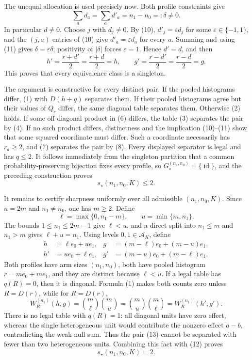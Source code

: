 The unequal allocation is used precisely now. Both profile constraints give
\[
 \sum_a d_a=\sum_a d'_a=n_1-n_0=:\delta\neq0.
 \tag{11}
\]
In particular \(d\neq0\). Choose \(j\) with \(d_j\neq0\). By (10), \(d'_j=\varepsilon d_j\) for some \(\varepsilon\in\{-1,1\}\), and the \((j,a)\) entries of (10) give \(d'_a=\varepsilon d_a\) for every \(a\). Summing and using (11) gives \(\delta=\varepsilon\delta\); positivity of \(|\delta|\) forces \(\varepsilon=1\). Hence \(d'=d\), and then
\[
 h'=\frac{r+d'}2=\frac{r+d}2=h,
 \qquad
 g'=\frac{r-d'}2=\frac{r-d}2=g.
\]
This proves that every equivalence class is a singleton.

The argument is constructive for every distinct pair. If the pooled histograms differ, (1) with \(D(h+g)\) separates them. If their pooled histograms agree but their values of \(Q_r\) differ, the same diagonal table separates them. Otherwise (2) holds. If some off-diagonal product in (6) differs, the table (3) separates the pair by (4). If no such product differs, distinctness and the implication (10)--(11) show that some squared coordinate must differ. Such a coordinate necessarily has \(r_a\geq2\), and (7) separates the pair by (8). Every displayed separator is legal and has \(q\leq2\). It follows immediately from the singleton partition that a common probability-preserving bijection fixes every profile, so \(G_\star^{(n_1,n_0)}=\{\operatorname{id}\}\), and the preceding construction proves
\[
 s_\star(n_1,n_0,K)\leq2.
 \tag{12}
\]

It remains to certify sharpness uniformly over all admissible \((n_1,n_0,K)\). Since \(n=2m\) and \(n_1\neq n_0\), one has \(m\geq2\). Define
\[
 \ell=\max\{0,n_1-m\},\qquad u=\min\{m,n_1\}.
\]
The bounds \(1\leq n_1\leq2m-1\) give \(\ell<u\), and a direct split into \(n_1\leq m\) and \(n_1>m\) gives \(\ell+u=n_1\). Using levels \(0,1\in\mathcal A_K\), define
\[
 \begin{aligned}
 h&=\ell e_0+u e_1,
 &g&=(m-\ell)e_0+(m-u)e_1,\\
 h'&=u e_0+\ell e_1,
 &g'&=(m-u)e_0+(m-\ell)e_1.
 \end{aligned}
 \tag{13}
\]
Both profiles have arm sizes \((n_1,n_0)\), both have pooled histogram \(r=me_0+me_1\), and they are distinct because \(\ell<u\). If a legal table has \(q(R)=0\), then it is diagonal. Formula (1) makes both counts zero unless \(R=D(r)\), while for \(R=D(r)\),
\[
 W_R^{(n_1)}(h,g)=\binom m\ell\binom mu
 =\binom mu\binom m\ell
 =W_R^{(n_1)}(h',g').
 \tag{14}
\]
There is no legal table with \(q(R)=1\): all diagonal units have zero effect, whereas the single heterogeneous unit would contribute the nonzero effect \(a-b\), contradicting the weak-null sum. Thus the pair (13) cannot be separated with fewer than two heterogeneous units. Combining this fact with (12) proves
\[
 s_\star(n_1,n_0,K)=2.
\]

